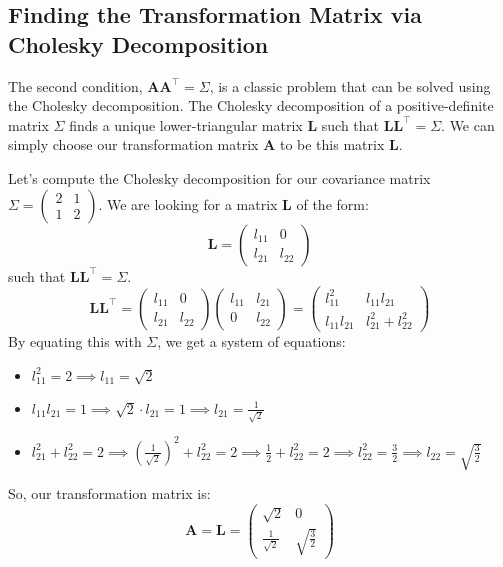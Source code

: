 \documentclass[11pt,a4paper]{article}
\newcommand{\mat}[1]{\mathbf{#1}}
\newcommand{\T}{\top}
\begin{document}
\subsection{Finding the Transformation Matrix via Cholesky Decomposition}
The second condition, $\mat{A}\mat{A}^\T = \Sigma$, is a classic problem that can be solved using the Cholesky decomposition. The Cholesky decomposition of a positive-definite matrix $\Sigma$ finds a unique lower-triangular matrix $\mat{L}$ such that $\mat{L}\mat{L}^\T = \Sigma$. We can simply choose our transformation matrix $\mat{A}$ to be this matrix $\mat{L}$.

Let's compute the Cholesky decomposition for our covariance matrix $\Sigma = \begin{pmatrix} 2 & 1 \\ 1 & 2 \end{pmatrix}$. We are looking for a matrix $\mat{L}$ of the form:
\[ \mat{L} = \begin{pmatrix} l_{11} & 0 \\ l_{21} & l_{22} \end{pmatrix} \]
such that $\mat{L}\mat{L}^\T = \Sigma$.
\[ \mat{L}\mat{L}^\T = \begin{pmatrix} l_{11} & 0 \\ l_{21} & l_{22} \end{pmatrix} \begin{pmatrix} l_{11} & l_{21} \\ 0 & l_{22} \end{pmatrix} = \begin{pmatrix} l_{11}^2 & l_{11}l_{21} \\ l_{11}l_{21} & l_{21}^2 + l_{22}^2 \end{pmatrix} \]
By equating this with $\Sigma$, we get a system of equations:
\begin{itemize}
    \item $l_{11}^2 = 2 \implies l_{11} = \sqrt{2}$
    \item $l_{11}l_{21} = 1 \implies \sqrt{2} \cdot l_{21} = 1 \implies l_{21} = \frac{1}{\sqrt{2}}$
    \item $l_{21}^2 + l_{22}^2 = 2 \implies \left(\frac{1}{\sqrt{2}}\right)^2 + l_{22}^2 = 2 \implies \frac{1}{2} + l_{22}^2 = 2 \implies l_{22}^2 = \frac{3}{2} \implies l_{22} = \sqrt{\frac{3}{2}}$
\end{itemize}
So, our transformation matrix is:
\[ \mat{A} = \mat{L} = \begin{pmatrix} \sqrt{2} & 0 \\ \frac{1}{\sqrt{2}} & \sqrt{\frac{3}{2}} \end{pmatrix} \]
\end{document}
